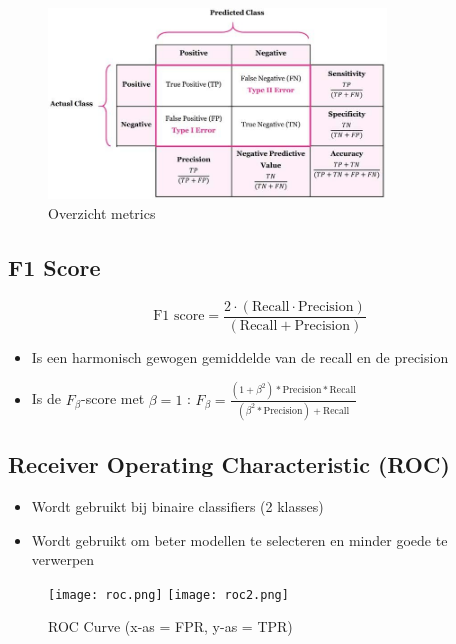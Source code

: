 \documentclass{article}
\begin{document}
\begin{figure}[H]
    \centering
    \includegraphics[width=0.8\textwidth]{confusion-matrix-metrics.jpg}
    \caption{Overzicht metrics}
\end{figure}


\subsection{F1 Score}

\begin{equation}
    \text{F1 score} = \frac{2\cdot(\text{Recall} \cdot \text{Precision})}{(\text{Recall} + \text{Precision})}
\end{equation}

\begin{itemize}
    \item Is een harmonisch gewogen gemiddelde van de recall en de precision
    \item Is de $F_\beta$-score met $\beta = 1$ : $F_{\beta} = \frac{(1+\beta^2)*\text{Precision}*\text{Recall}}{(\beta^2 * \text{Precision}) + \text{Recall}}$
\end{itemize}

\subsection{Receiver Operating Characteristic (ROC)}

\begin{itemize}
    \item Wordt gebruikt bij binaire classifiers (2 klasses)
    \item Wordt gebruikt om beter modellen te selecteren en minder goede te verwerpen
\end{itemize}

\begin{figure}[H]
    \centering
    \texttt{[image: roc.png]}
    \texttt{[image: roc2.png]}
    \caption{ROC Curve (x-as = FPR, y-as = TPR)}
\end{figure}
\end{document}
